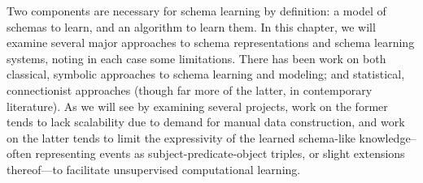 Two components are necessary for schema learning by definition: a model of schemas to learn, and an algorithm to learn them. In this chapter, we will examine several major approaches to schema representations and schema learning systems, noting in each case some limitations. There has been work on both classical, symbolic approaches to schema learning and modeling; and statistical, connectionist approaches (though far more of the latter, in contemporary literature). As we will see by examining several projects, work on the former tends to lack scalability due to demand for manual data construction, and work on the latter tends to limit the expressivity of the learned schema-like knowledge--often representing events as subject-predicate-object triples, or slight extensions thereof---to facilitate unsupervised computational learning.